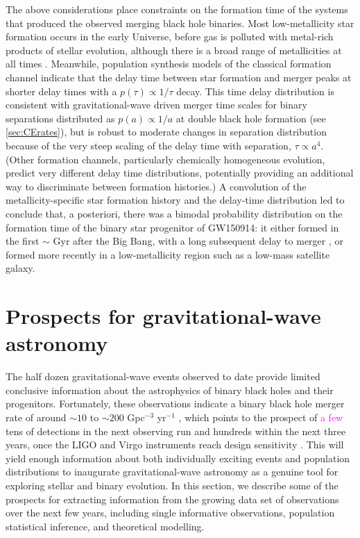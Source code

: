 \documentclass[iop,onecolumn]{revtex4}
\newcommand{\ilya}[1]{\textcolor{magenta}{#1}}
\begin{document}
The above considerations place constraints on the formation time of the systems that produced the observed merging black hole binaries. Most low-metallicity star formation occurs in the early Universe, before gas is polluted with metal-rich products of stellar evolution, although there is a broad range of metallicities at all times \citep[e.g.,][]{LangerNorman:2006,TaylorKobayashi:2015}. Meanwhile, population synthesis models of the classical formation channel indicate that  the delay time between star formation and merger peaks at shorter delay times with a $p(\tau) \propto 1/\tau$ decay.  This time delay distribution is consistent with gravitational-wave driven merger time scales for binary separations distributed as $p(a) \propto 1/a$ at double black hole formation (see \autoref{sec:CErates}), but  is robust to moderate changes in separation distribution because of the very steep scaling of the delay time with separation, $\tau \propto a^4$.  (Other formation channels, particularly chemically homogeneous evolution, predict very different delay time distributions, potentially providing an additional way to discriminate between formation histories.)  A convolution of the metallicity-specific star formation history and the delay-time distribution led \citet{Belczynski:2016} to conclude that, a posteriori, there was a bimodal probability distribution on the formation time of the binary star progenitor of GW150914: it either formed in the first $\sim$ Gyr after the Big Bang, with a long subsequent delay to merger \citep{Dominik:2014}, or formed more recently in a low-metallicity region such as a low-mass satellite galaxy.  

  

\section{Prospects for gravitational-wave astronomy}\label{prospect}

The half dozen gravitational-wave events observed to date provide limited conclusive information about the astrophysics of binary black holes and their progenitors.  Fortunately, these observations indicate a binary black hole merger rate of around $\sim 10$ to $\sim 200$ Gpc$^{-3}$ yr$^{-1}$ \citep{GW150914:rates,GW170104}, which points to the prospect of \ilya{a few} tens of detections in the next observing run and hundreds within the next three years, once the LIGO and Virgo instruments reach design sensitivity \citep{scenarios}.  This will yield enough information about both individually exciting events and population distributions to inaugurate gravitational-wave astronomy as a genuine tool for exploring stellar and binary evolution.  In this section, we describe some of the prospects for extracting information from the growing data set of observations over the next few years, including single informative observations, population statistical inference, and theoretical modelling.
\end{document}
